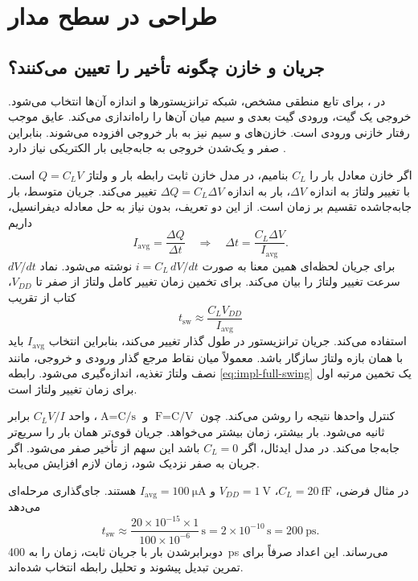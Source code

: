 \section{طراحی در سطح مدار}
\label{sec:book-circuit-design}
\subsection{جریان و خازن چگونه تأخیر را تعیین می‌کنند؟}
در ، برای تابع منطقی مشخص، شبکه ترانزیستورها و اندازه آن‌ها
انتخاب می‌شود. خروجی یک گیت، ورودی گیت بعدی و سیم میان آن‌ها را راه‌اندازی می‌کند.
عایق  موجب رفتار خازنی ورودی است. خازن‌های  و سیم نیز به بار
خروجی افزوده می‌شوند. بنابراین صفر و یک‌شدن خروجی به جابه‌جایی بار الکتریکی نیاز دارد
\cite[بخش ، شکل ]{weste}.

اگر خازن معادل بار را \(C_L\) بنامیم، در مدل خازن ثابت رابطه بار و ولتاژ
\(Q=C_LV\) است. با تغییر ولتاژ به اندازه \(\Delta V\)، بار به اندازه
\(\Delta Q=C_L\Delta V\) تغییر می‌کند. جریان متوسط، بار جابه‌جاشده تقسیم بر زمان است.
از این دو تعریف، بدون نیاز به حل معادله دیفرانسیل، داریم
\begin{equation}
 I_{\mathrm{avg}}=\frac{\Delta Q}{\Delta t}
 \quad\Longrightarrow\quad
 \Delta t=\frac{C_L\Delta V}{I_{\mathrm{avg}}}.
 \label{eq:impl-charge-delay}
\end{equation}
برای جریان لحظه‌ای همین معنا به صورت \(i=C_L\,dV/dt\) نوشته می‌شود.
نماد \(dV/dt\) سرعت تغییر ولتاژ را بیان می‌کند. برای تخمین زمان تغییر کامل ولتاژ
از صفر تا \(V_{DD}\)، کتاب از تقریب
\begin{equation}
 t_{\mathrm{sw}}\approx\frac{C_LV_{DD}}{I_{\mathrm{avg}}}
 \label{eq:impl-full-swing}
\end{equation}
استفاده می‌کند. جریان ترانزیستور در طول گذار تغییر می‌کند، بنابراین انتخاب
\(I_{\mathrm{avg}}\) باید با همان بازه ولتاژ سازگار باشد. 
معمولاً میان نقاط مرجع گذار ورودی و خروجی، مانند نصف ولتاژ تغذیه، اندازه‌گیری می‌شود.
رابطه \eqref{eq:impl-full-swing} یک تخمین مرتبه اول برای زمان تغییر ولتاژ است.

کنترل واحدها نتیجه را روشن می‌کند. چون \(\unit{\farad}=\unit{\coulomb\per\volt}\)
و \(\unit{\ampere}=\unit{\coulomb\per\second}\)، واحد
\(C_LV/I\) برابر ثانیه می‌شود. بار بیشتر، زمان بیشتر می‌خواهد. جریان قوی‌تر همان بار
را سریع‌تر جابه‌جا می‌کند. در مدل ایدئال، اگر \(C_L=0\) باشد این سهم از تأخیر صفر
می‌شود. اگر جریان به صفر نزدیک شود، زمان لازم افزایش می‌یابد.

در مثال فرضی، \(C_L=\qty{20}{\femto\farad}\)، \(V_{DD}=\qty{1}{\volt}\)
و \(I_{\mathrm{avg}}=\qty{100}{\micro\ampere}\) هستند. جای‌گذاری مرحله‌ای می‌دهد
\begin{equation*}
 t_{\mathrm{sw}}\approx
 \frac{20\times10^{-15}\times1}{100\times10^{-6}}\,\unit{\second}
 =2\times10^{-10}\,\unit{\second}=\qty{200}{\pico\second}.
\end{equation*}
دوبرابرشدن بار با جریان ثابت، زمان را به \qty{400}{\pico\second} می‌رساند.
این اعداد صرفاً برای تمرین تبدیل پیشوند و تحلیل رابطه انتخاب شده‌اند.

